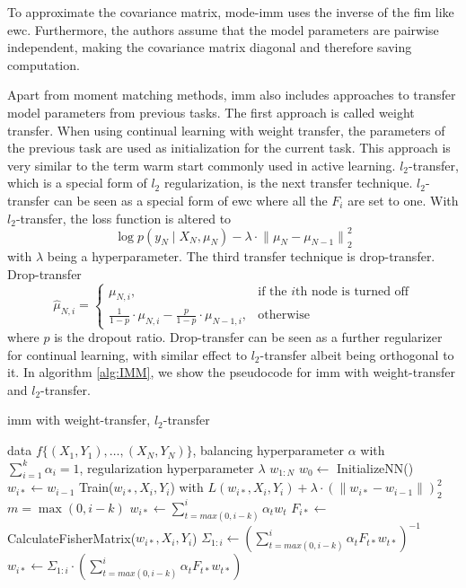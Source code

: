 To approximate the covariance matrix, mode-\gls{imm} uses the inverse of the \gls{fim} like \gls{ewc}. Furthermore, the authors assume that
the model parameters are pairwise independent, making the covariance matrix diagonal and therefore saving computation. \par
Apart from moment matching methods, \gls{imm} also includes approaches to transfer model parameters from previous tasks. The first approach is called
weight transfer. When using continual learning with weight transfer, the parameters of the previous task are used as initialization for the
current task. This approach is very similar to the term warm start commonly used in active learning. $l_2$-transfer, which is a special form of 
$l_2$ regularization, is the next transfer technique. $l_2$-transfer can be seen as a special form of \gls{ewc} where all the $F_i$ are set to one. 
With $l_2$-transfer, the loss function is altered to
\begin{equation}
    \log p(y_N \mid X_N, \mu_N) - \lambda \cdot {\lVert \mu_N - \mu_{N-1} \rVert}^2_2
\end{equation}
with $\lambda$ being a hyperparameter. The third transfer technique is drop-transfer. Drop-transfer
\begin{equation}
    \hat{\mu}_{N,i} = \begin{cases} \mu_{N,i}, & \text{if the }i \text{th node is turned off} \\
    \frac{1}{1-p} \cdot \mu_{N,i} - \frac{p}{1-p} \cdot \mu_{N-1,i}, & \text{otherwise}  \end{cases}
\end{equation}
where $p$ is the dropout ratio. Drop-transfer can be seen as a further regularizer for continual learning, with similar effect to $l_2$-transfer albeit
being orthogonal to it. In algorithm \ref{alg:IMM}, we show the pseudocode for \gls{imm} with weight-transfer and $l_2$-transfer. \par

\begin{algorithm}
    \caption{\gls{imm} with weight-transfer, $l_2$-transfer} \label{alg:IMM}
    \begin{algorithmic}
        \Require data $f\{ (X_1,Y_1),\ldots,(X_N,Y_N)\}$, balancing hyperparameter $\alpha$ with $\sum_{i=1}^k \alpha_i = 1$,
        regularization hyperparameter $\lambda$
        \return $w_{1:N}$
        \State $w_0 \leftarrow $ InitializeNN()
            \State $w_{i*} \leftarrow w_{i-1}$
            \State Train($w_{i*},X_i,Y_i$) with $L(w_{i*},X_i,Y_i) + \lambda \cdot (\lVert w_{i*} - w_{i-1} \rVert)^2_2$
            \State $m=\max (0,i-k)$
            \State $w_{i*} \leftarrow \sum_{t=max(0,i-k)}^i \alpha_t w_{t}$
            \State $F_{i*} \leftarrow$ CalculateFisherMatrix($w_{i*},X_i,Y_i$)
            \State $\Sigma_{1:i} \leftarrow (\sum_{t=max(0,i-k)}^i \alpha_t F_{t*} w_{t*})^{-1}$
            \State $w_{i*} \leftarrow \Sigma_{1:i} \cdot (\sum_{t=max(0,i-k)}^i \alpha_t F_{t*} w_{t*})$
            \EndIf
        \EndFor
    \end{algorithmic}
\end{algorithm}


